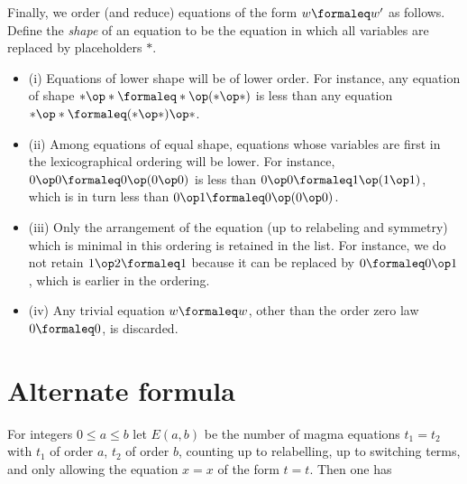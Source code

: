 Finally, we order (and reduce) equations of the form $w \formaleq w'$ as follows. Define the \emph{shape} of an equation to be the equation in which all variables are replaced by placeholders $\ast$.
\begin{itemize}
  \item (i) Equations of lower shape will be of lower order.  For instance, any equation of shape $\ast \op \ast \formaleq \ast \op (\ast \op \ast)$ is less than any equation $\ast \op \ast \formaleq (\ast \op \ast) \op \ast$.
  \item (ii) Among equations of equal shape, equations whose variables are first in the lexicographical ordering will be lower. For instance, $0 \op 0 \formaleq 0 \op (0 \op 0)$ is less than $0 \op 0 \formaleq 1 \op (1 \op 1)$, which is in turn less than $0 \op 1 \formaleq 0 \op (0 \op 0)$.
  \item (iii) Only the arrangement of the equation (up to relabeling and symmetry) which is minimal in this ordering is retained in the list.  For instance, we do not retain $1 \op 2 \formaleq 1$ because it can be replaced by $0 \formaleq 0 \op 1$, which is earlier in the ordering.
\item (iv) Any trivial equation $w \formaleq w$, other than the order zero law $0 \formaleq 0$, is discarded.
\end{itemize}

\section{Alternate formula}

For integers $0 \le a \le b$ let $E(a,b)$ be the number of magma equations $t_1 = t_2$ with $t_1$ of order $a$, $t_2$ of order $b$, counting up to relabelling, up to switching terms, and only allowing the equation $x=x$ of the form $t=t$.  Then one has


